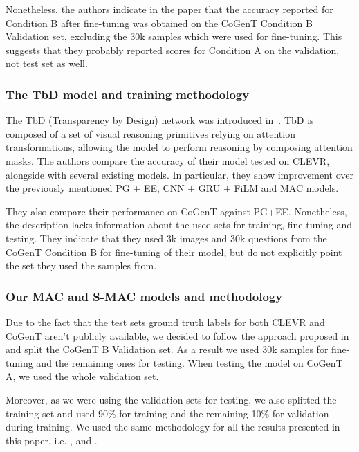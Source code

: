 Nonetheless, the authors indicate in the paper that the accuracy reported for Condition B after fine-tuning was obtained on the CoGenT Condition B Validation set, excluding the 30k samples which were used for fine-tuning.
This suggests that they probably reported scores for Condition A on the validation, not test set as well.


\subsubsection{The TbD model and training methodology}

The TbD (Transparency by Design) network was introduced in~\cite{mascharka2018transparency}.
TbD is composed of a set of visual reasoning primitives relying on attention transformations, allowing the model to perform reasoning by composing attention masks.
The authors compare the accuracy of their model tested on CLEVR, alongside with several existing models. In particular, they show improvement over the previously mentioned PG + EE, CNN + GRU + FiLM and MAC models.

They also compare their performance on CoGenT against PG+EE.
Nonetheless, the description lacks information about the used sets for training, fine-tuning and testing. 
They indicate that they used 3k images and 30k questions from the CoGenT Condition B for fine-tuning of their model, but do not explicitly point the set they used the samples from.


\subsubsection{Our MAC and S-MAC models and methodology}

Due to the fact that the test sets ground truth labels for both CLEVR and CoGenT aren't publicly available, we decided to follow the approach proposed in~\cite{perez2017film} and split the CoGenT B Validation set.
As a result we used 30k samples for fine-tuning and the remaining ones for testing.
When testing the model on CoGenT A, we used the whole validation set.

Moreover, as we were using the validation sets for testing, we also splitted the training set and used 90\% for training and the remaining 10\% for validation during training.
We used the same methodology for all the results presented in this paper, i.e. ,  and .
